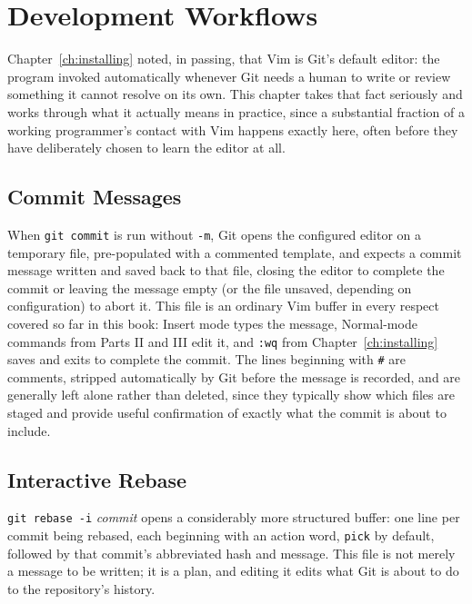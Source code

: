 \chapter{Development Workflows}
\label{ch:workflows}

Chapter~\ref{ch:installing} noted, in passing, that Vim is Git's default editor: the program invoked automatically whenever Git needs a human to write or review something it cannot resolve on its own. This chapter takes that fact seriously and works through what it actually means in practice, since a substantial fraction of a working programmer's contact with Vim happens exactly here, often before they have deliberately chosen to learn the editor at all.

\section{Commit Messages}

When \texttt{git commit} is run without \texttt{-m}, Git opens the configured editor on a temporary file, pre-populated with a commented template, and expects a commit message written and saved back to that file, closing the editor to complete the commit or leaving the message empty (or the file unsaved, depending on configuration) to abort it. This file is an ordinary Vim buffer in every respect covered so far in this book: Insert mode types the message, Normal-mode commands from Parts II and III edit it, and \texttt{:wq} from Chapter~\ref{ch:installing} saves and exits to complete the commit. The lines beginning with \texttt{\#} are comments, stripped automatically by Git before the message is recorded, and are generally left alone rather than deleted, since they typically show which files are staged and provide useful confirmation of exactly what the commit is about to include.

\section{Interactive Rebase}

\texttt{git rebase -i} \textit{commit} opens a considerably more structured buffer: one line per commit being rebased, each beginning with an action word, \texttt{pick} by default, followed by that commit's abbreviated hash and message. This file is not merely a message to be written; it is a plan, and editing it edits what Git is about to do to the repository's history.

